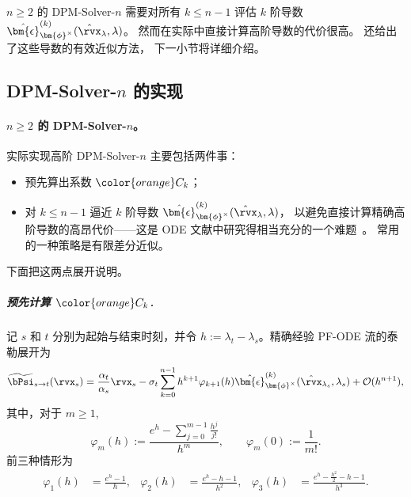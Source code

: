 $n \geq 2$ 的 DPM-Solver-$n$ 需要对所有 $k \leq n-1$ 评估
$k$ 阶导数 {\color{cyan}$\hat{\bm{\epsilon}}_{\bm{\phi}^\times}^{(k)}(\hat\rvx_\lambda, \lambda)$}。
然而在实际中直接计算高阶导数的代价很高。
\citet{lu2022dpm} 还给出了这些导数的有效近似方法，
下一小节将详细介绍。


\subsection{DPM-Solver-$n$ 的实现}\label{subsec:dpm-n-method}

\paragraph{$n \geq 2$ 的 DPM-Solver-$n$。}
实际实现高阶 DPM-Solver-$n$ 主要包括两件事：
\begin{itemize}
    \item 预先算出系数 ${\color{orange}C_k}$；
    \item 对 $k \leq n-1$ 逼近 $k$ 阶导数
    {\color{cyan}$\hat{\bm{\epsilon}}_{\bm{\phi}^\times}^{(k)}(\hat\rvx_\lambda,\lambda)$}，
    以避免直接计算精确高阶导数的高昂代价——这是 ODE 文献中研究得相当充分的一个难题~\citep{hochbruck2005explicit,luan2021efficient}。
    常用的一种策略是有限差分近似。
\end{itemize}

下面把这两点展开说明。


\subparagraph{预先计算 ${\color{orange}C_k}$.}
记 $s$ 和 $t$ 分别为起始与结束时刻，并令
$h:=\lambda_t-\lambda_s$。精确经验 PF-ODE 流的泰勒展开为
\begin{equation}
\label{eq:analytic_expansion}
\widetilde\bPsi_{s\to t}(\rvx_s)
=
\frac{\alpha_t}{\alpha_s}\rvx_s
-
\sigma_t
\sum_{k=0}^{n-1}
h^{k+1}
\varphi_{k+1}(h)
\hat{\bm{\epsilon}}_{\bm{\phi}^\times}^{(k)}
(\hat\rvx_{\lambda_s},\lambda_s)
+
\mathcal O(h^{n+1}),
\end{equation}
其中，对于 $m\geq1$,
\[
\varphi_m(h)
:=
\frac{
e^h-\sum_{j=0}^{m-1}\frac{h^j}{j!}
}{
h^m
},
\qquad
\varphi_m(0):=\frac{1}{m!}.
\]
前三种情形为
\begin{align*}
\varphi_1(h)
&=
\frac{e^h-1}{h},
&
\varphi_2(h)
&=
\frac{e^h-h-1}{h^2},
&
\varphi_3(h)
&=
\frac{e^h-\frac{h^2}{2}-h-1}{h^3}.
\end{align*}



